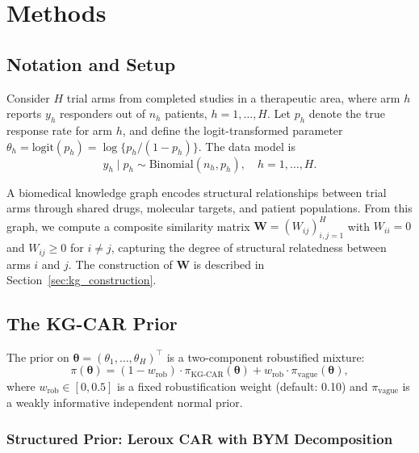 \documentclass[12pt]{article}
\newcommand{\btheta}{\boldsymbol{\theta}}
\newcommand{\bW}{\mathbf{W}}
\begin{document}
\section{Methods}
\label{sec:methods}

\subsection{Notation and Setup}
\label{sec:notation}

Consider $H$ trial arms from completed studies in a therapeutic area, where arm $h$ reports $y_h$ responders out of $n_h$ patients, $h = 1, \ldots, H$. Let $p_h$ denote the true response rate for arm $h$, and define the logit-transformed parameter $\theta_h = \text{logit}(p_h) = \log\{p_h / (1 - p_h)\}$. The data model is
\begin{equation}
\label{eq:data_model}
y_h \mid p_h \sim \text{Binomial}(n_h, p_h), \quad h = 1, \ldots, H.
\end{equation}

A biomedical knowledge graph encodes structural relationships between trial arms through shared drugs, molecular targets, and patient populations. From this graph, we compute a composite similarity matrix $\bW = (W_{ij})_{i,j=1}^{H}$ with $W_{ii} = 0$ and $W_{ij} \geq 0$ for $i \neq j$, capturing the degree of structural relatedness between arms $i$ and $j$. The construction of $\bW$ is described in Section~\ref{sec:kg_construction}.

\subsection{The KG-CAR Prior}
\label{sec:kgcar_prior}

The prior on $\btheta = (\theta_1, \ldots, \theta_H)^\top$ is a two-component robustified mixture:
\begin{equation}
\label{eq:mixture}
\pi(\btheta) = (1 - w_{\text{rob}}) \cdot \pi_{\text{KG-CAR}}(\btheta) + w_{\text{rob}} \cdot \pi_{\text{vague}}(\btheta),
\end{equation}
where $w_{\text{rob}} \in [0, 0.5]$ is a fixed robustification weight (default: 0.10) and $\pi_{\text{vague}}$ is a weakly informative independent normal prior.

\subsubsection{Structured Prior: Leroux CAR with BYM Decomposition}
\end{document}
